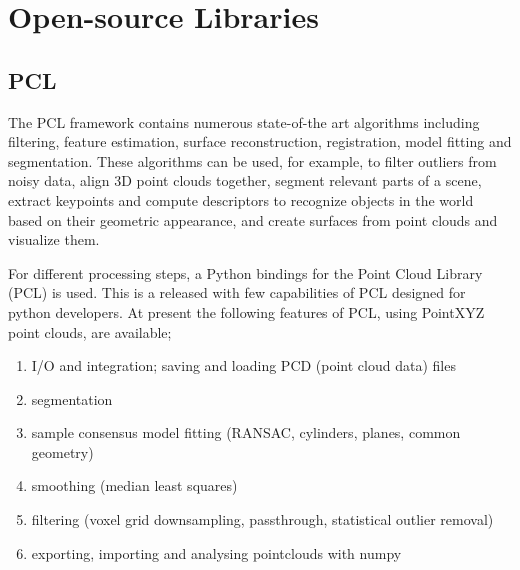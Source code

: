 \section{Open-source Libraries}
\subsection{PCL}

The PCL\cite{pcl} framework contains numerous state-of-the art algorithms including filtering, feature estimation, surface reconstruction, registration, model fitting and segmentation. These algorithms can be used, for example, to filter outliers from noisy data, align 3D point clouds together, segment relevant parts of a scene, extract keypoints and compute descriptors to recognize objects in the world based on their geometric appearance, and create surfaces from point clouds and visualize them. 

For different processing steps, a Python bindings for the Point Cloud Library (PCL) is used. This is a released with few capabilities of PCL designed for python developers. At present the following features of PCL, using PointXYZ point clouds, are available;

\begin{enumerate}
    \item I/O and integration; saving and loading PCD (point cloud data) files
    \item segmentation
    \item sample consensus model fitting (RANSAC, cylinders, planes, common geometry)
    \item smoothing (median least squares)
    \item filtering (voxel grid downsampling, passthrough, statistical outlier removal)
    \item exporting, importing and analysing pointclouds with numpy
\end{enumerate}


